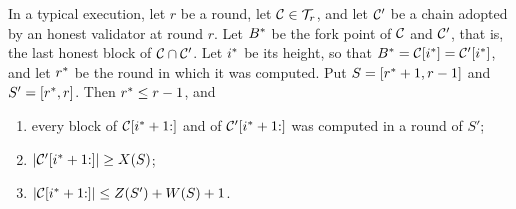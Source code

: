 \begin{lemma}[Counting]\label{lem.count}
    In a typical execution, let $r$ be a round, let $\mathcal{C}\in\mathcal{T}_r$, and let
    $\mathcal{C}'$ be a chain adopted by an honest validator at round $r$. Let $B^{*}$ be
    the fork point of $\mathcal{C}$ and $\mathcal{C}'$, that is, the last honest block of
    $\mathcal{C}\cap\mathcal{C}'$. Let $i^{*}$ be its height, so that
    $B^{*}=\mathcal{C}[i^{*}]=\mathcal{C}'[i^{*}]$, and let $r^{*}$ be the round in which it was
    computed. Put
    $S=[r^{*}+1,r-1]$ and $S'=[r^{*},r]$. Then $r^{*}\le r-1$, and
    \begin{enumerate}
        \item every block of $\mathcal{C}[i^{*}+1{:}]$ and of $\mathcal{C}'[i^{*}+1{:}]$ was
            computed in a round of $S'$;
        \item $\lvert \mathcal{C}'[i^{*}+1{:}]\rvert\ge X(S)$;
        \item $\lvert \mathcal{C}[i^{*}+1{:}]\rvert\le Z(S')+W(S)+1$.
    \end{enumerate}
\end{lemma}

